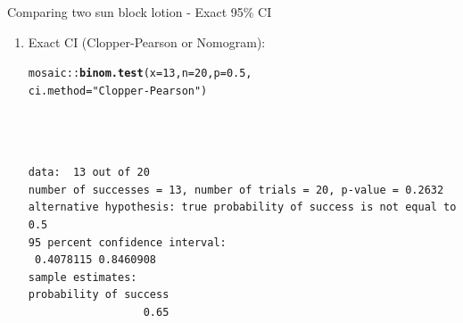 \documentclass{beamer}\usepackage[]{graphicx}\usepackage[]{color}
\newcommand{\hlnum}[1]{\textcolor[rgb]{0.686,0.059,0.569}{#1}}%
\newcommand{\hlstr}[1]{\textcolor[rgb]{0.192,0.494,0.8}{#1}}%
\newcommand{\hlopt}[1]{\textcolor[rgb]{0,0,0}{#1}}%
\newcommand{\hlstd}[1]{\textcolor[rgb]{0.345,0.345,0.345}{#1}}%
\newcommand{\hlkwc}[1]{\textcolor[rgb]{0.333,0.667,0.333}{#1}}%
\newcommand{\hlkwd}[1]{\textcolor[rgb]{0.737,0.353,0.396}{\textbf{#1}}}%
\newenvironment{knitrout}{}{} %
\begin{document}
\begin{frame}[fragile]{Comparing two sun block lotion - Exact 95\% CI}
\small
\begin{enumerate}
	\setlength\itemsep{1em}
	
	\item Exact CI (Clopper-Pearson or Nomogram):
\begin{knitrout}\scriptsize
{}\color{fgcolor}
\begin{alltt}
\hlstd{mosaic}\hlopt{::}\hlkwd{binom.test}\hlstd{(}\hlkwc{x} \hlstd{=} \hlnum{13}\hlstd{,} \hlkwc{n} \hlstd{=} \hlnum{20}\hlstd{,} \hlkwc{p} \hlstd{=} \hlnum{0.5}\hlstd{,}
\hlkwc{ci.method} \hlstd{=} \hlstr{"Clopper-Pearson"}\hlstd{)}
\end{alltt}
\begin{verbatim}



data:  13 out of 20
number of successes = 13, number of trials = 20, p-value = 0.2632
alternative hypothesis: true probability of success is not equal to 0.5
95 percent confidence interval:
 0.4078115 0.8460908
sample estimates:
probability of success 
                  0.65 
\end{verbatim}

\end{knitrout}
	

	
\end{enumerate}

\end{frame}
\end{document}
